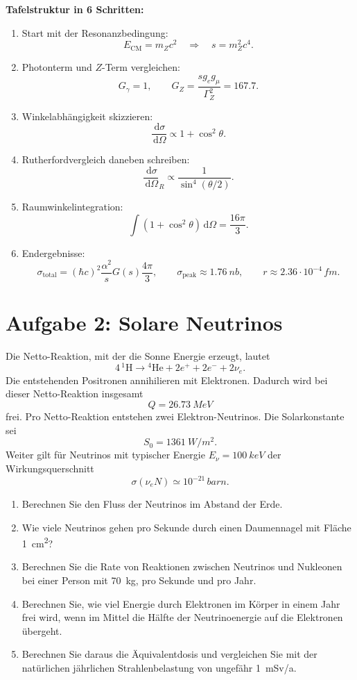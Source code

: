 \documentclass[11pt,a4paper]{scrartcl}
\newcommand{\dd}{\,\mathrm{d}}
\newcommand{\diffxs}{\frac{\dd\sigma}{\dd\Omega}}
\theoremstyle{definition}
\theoremstyle{plain}
\theoremstyle{remark}
\begin{document}
\begin{talkbox}
\textbf{Tafelstruktur in 6 Schritten:}
\begin{enumerate}
    \item Start mit der Resonanzbedingung:
    \[
        E_{\mathrm{CM}}=m_Zc^2
        \quad\Rightarrow\quad
        s=m_Z^2c^4.
    \]
    \item Photonterm und $Z$-Term vergleichen:
    \[
        G_\gamma=1,
        \qquad
        G_Z=\frac{s g_eg_\mu}{\Gamma_Z^2}=167.7.
    \]
    \item Winkelabhängigkeit skizzieren:
    \[
        \diffxs\propto1+\cos^2\theta.
    \]
    \item Rutherfordvergleich daneben schreiben:
    \[
        \diffxs_R\propto\frac{1}{\sin^4(\theta/2)}.
    \]
    \item Raumwinkelintegration:
    \[
        \int(1+\cos^2\theta)\dd\Omega=\frac{16\pi}{3}.
    \]
    \item Endergebnisse:
    \[
        \sigma_{\mathrm{total}}=(\hbar c)^2\frac{\alpha^2}{s}G(s)\frac{4\pi}{3},
        \qquad
        \sigma_{\mathrm{peak}}\approx\SI{1.76}{nb},
        \qquad
        r\approx2.36\cdot10^{-4}\,\si{fm}.
    \]
\end{enumerate}
\end{talkbox}

\FloatBarrier
\newpage

\section{Aufgabe 2: Solare Neutrinos}

\begin{taskbox}
Die Netto-Reaktion, mit der die Sonne Energie erzeugt, lautet
\[
    4\,{}^1\mathrm{H}\to{}^4\mathrm{He}+2e^+ +2e^-+2\nu_e.
\]
Die entstehenden Positronen annihilieren mit Elektronen. Dadurch wird bei dieser Netto-Reaktion insgesamt
\[
    Q=\SI{26.73}{MeV}
\]
frei. Pro Netto-Reaktion entstehen zwei Elektron-Neutrinos. Die Solarkonstante sei
\[
    S_0=\SI{1361}{W/m^2}.
\]
Weiter gilt für Neutrinos mit typischer Energie $E_\nu=\SI{100}{keV}$ der Wirkungsquerschnitt
\[
    \sigma(\nu_eN)\simeq10^{-21}\,\si{barn}.
\]
\begin{enumerate}[label=(\alph*)]
    \item Berechnen Sie den Fluss der Neutrinos im Abstand der Erde.
    \item Wie viele Neutrinos gehen pro Sekunde durch einen Daumennagel mit Fläche \SI{1}{cm^2}?
    \item Berechnen Sie die Rate von Reaktionen zwischen Neutrinos und Nukleonen bei einer Person mit \SI{70}{kg}, pro Sekunde und pro Jahr.
    \item Berechnen Sie, wie viel Energie durch Elektronen im Körper in einem Jahr frei wird, wenn im Mittel die Hälfte der Neutrinoenergie auf die Elektronen übergeht.
    \item Berechnen Sie daraus die Äquivalentdosis und vergleichen Sie mit der natürlichen jährlichen Strahlenbelastung von ungefähr \SI{1}{mSv/a}.
\end{enumerate}
\end{taskbox}
\end{document}
